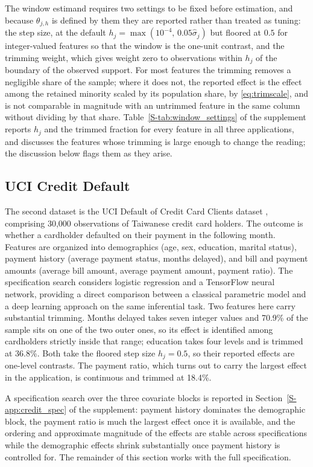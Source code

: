 \documentclass[12pt,a4paper]{article}
\numberwithin{equation}{section}
\theoremstyle{plain}
\theoremstyle{definition}
\begin{document}
	The window estimand requires two settings to be fixed before estimation, and
	because $\theta_{j,h}$ is defined by them they are reported rather than
	treated as tuning: the step size, at the default
	$h_j = \max(10^{-4},\, 0.05\hat{\sigma}_j)$ but floored at $0.5$ for
	integer-valued features so that the window is the one-unit contrast, and the
	trimming weight, which gives weight zero to observations within $h_j$ of the
	boundary of the observed support. For most features the trimming removes a
	negligible share of the sample; where it does not, the reported effect is the
	effect among the retained minority scaled by its population share, by
	\eqref{eq:trimscale}, and is not comparable in magnitude with an untrimmed
	feature in the same column without dividing by that share.
	Table~\ref{S-tab:window_settings} of the supplement reports $h_j$ and the
	trimmed fraction for every feature in all three applications, and discusses
	the features whose trimming is large enough to change the reading; the
	discussion below flags them as they arise.

		\subsection{UCI Credit Default}
	
	The second dataset is the UCI Default of Credit Card Clients dataset \citep{yeh2009, UCI}, comprising 30,000 observations of Taiwanese credit card holders. The outcome is whether a cardholder defaulted on their payment in the following month. Features are organized into demographics (age, sex, education, marital status), payment history (average payment status, months delayed), and bill and payment amounts (average bill amount, average payment amount, payment ratio). The specification search considers logistic regression and a TensorFlow neural network, providing a direct comparison between a classical parametric model and a deep learning approach on the same inferential task. Two features here carry substantial trimming. Months delayed takes seven integer values and 70.9\% of the sample sits on one of the two outer ones, so its effect is identified among cardholders strictly inside that range; education takes four levels and is trimmed at 36.8\%. Both take the floored step size $h_j = 0.5$, so their reported effects are one-level contrasts. The payment ratio, which turns out to carry the largest effect in the application, is continuous and trimmed at 18.4\%.
	
	A specification search over the three covariate blocks is reported in
	Section~\ref{S-app:credit_spec} of the supplement: payment history dominates
	the demographic block, the payment ratio is much the largest effect once it is
	available, and the ordering and approximate magnitude of the effects are
	stable across specifications while the demographic effects shrink
	substantially once payment history is controlled for. The remainder of this section works with
	the full specification.
\end{document}
